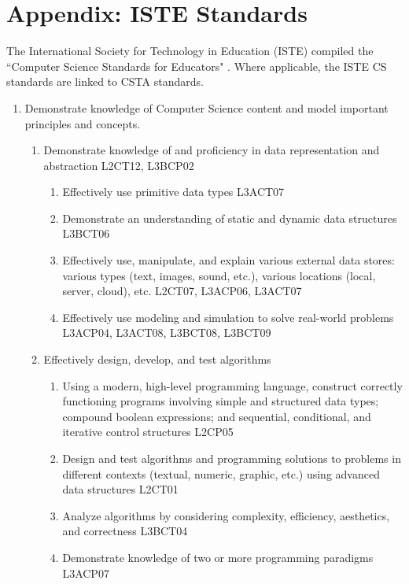 \chapter{Appendix: ISTE Standards} %

\label{AppendixISTE} %

The International Society for Technology in Education (ISTE) compiled the ``Computer Science Standards for Educators" \cite{iste}. Where applicable, the ISTE CS standards are linked to CSTA standards.
\begin{enumerate}
	\item Demonstrate knowledge of Computer Science content and model important principles and concepts. 	
	\begin{enumerate}
		\item Demonstrate knowledge of and proficiency in data representation and abstraction 					L2CT12, L3BCP02
		\begin{enumerate}
			\item Effectively use primitive data types 				L3ACT07
			\item Demonstrate an understanding of static and dynamic data structures				L3BCT06
			\item Effectively use, manipulate, and explain various external data stores: various types (text, images, sound, etc.), various locations (local, server, cloud), etc. 				L2CT07, L3ACP06, L3ACT07
			\item Effectively use modeling and simulation to solve real-world problems 				L3ACP04, L3ACT08, L3BCT08, L3BCT09
		\end{enumerate} 
		\item Effectively design, develop, and test algorithms
		\begin{enumerate}					
			\item Using a modern, high-level programming language, construct correctly functioning programs involving simple and structured data types; compound boolean expressions; and sequential, conditional, and iterative control structures 				L2CP05
			\item Design and test algorithms and programming solutions to problems in different contexts (textual, numeric, graphic, etc.) using advanced data structures 				L2CT01
			\item Analyze algorithms by considering complexity, efficiency, aesthetics, and correctness				L3BCT04
			\item Demonstrate knowledge of two or more programming paradigms				L3ACP07

\end{enumerate}
\end{enumerate}
\end{enumerate}
